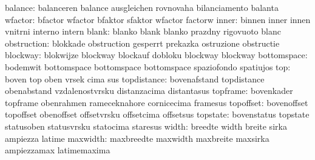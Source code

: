                   balance: balanceren                balance
                           ausgleichen               rovnovaha
                           bilanciamento             balanta
                  wfactor: bfactor                   wfactor
                           bfaktor                   sfaktor
                           wfactor                   factorw %
                    inner: binnen                    inner
                           innen                     vnitrni
                           interno                   intern
                    blank: blanko                    blank
                           blanko                    prazdny
                           rigovuoto                 blanc
              obstruction: blokkade                  obstruction
                           gesperrt                  prekazka
                           ostruzione                obstructie
                 blockway: blokwijze                 blockway
                           blockauf                  dobloku
                           blockway                  blockway %
              bottomspace: bodemwit                  bottomspace
                           bottomspace               bottomspace
                           spaziofondo               spatiujos
                      top: boven                     top
                           oben                      vrsek
                           cima                      sus
              topdistance: bovenafstand              topdistance
                           obenabstand               vzdalenostvrsku
                           distanzacima              distantasus
                 topframe: bovenkader                topframe
                           obenrahmen                rameceknahore
                           cornicecima               framesus
                topoffset: bovenoffset               topoffset
                           obenoffset                offsetvrsku
                           offsetcima                offsetsus
                 topstate: bovenstatus               topstate
                           statusoben                statusvrsku
                           statocima                 staresus
                    width: breedte                   width
                           breite                    sirka
                           ampiezza                  latime
                 maxwidth: maxbreedte                maxwidth
                           maxbreite                 maxsirka
                           ampiezzamax               latimemaxima
